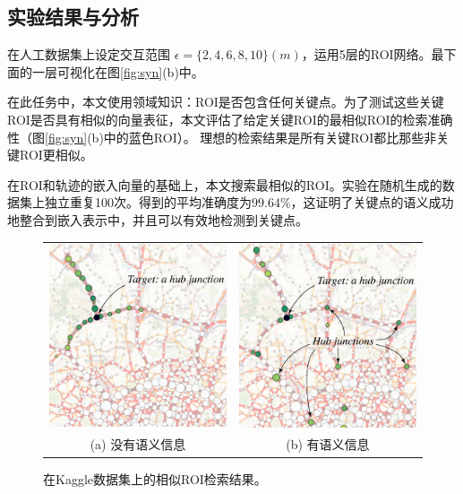 \subsection{实验结果与分析}
在人工数据集上设定交互范围 $\epsilon = \{2,4,6,8,10\}(m)$，运用5层的ROI网络。最下面的一层可视化在图\ref{fig:syn}(b)中。


在此任务中，本文使用领域知识：ROI是否包含任何关键点。为了测试这些关键ROI是否具有相似的向量表征，本文评估了给定关键ROI的最相似ROI的检索准确性（图\ref{fig:syn}(b)中的蓝色ROI）。 理想的检索结果是所有关键ROI都比那些非关键ROI更相似。

在ROI和轨迹的嵌入向量的基础上，本文搜索最相似的ROI。实验在随机生成的数据集上独立重复100次。得到的平均准确度为$\boldsymbol{99.64\%}$，这证明了关键点的语义成功地整合到嵌入表示中，并且可以有效地检测到关键点。



\tabcolsep=2pt
\begin{figure}[!t]
\centering
\begin{tabular}{cc}
\includegraphics[width=65mm]{pics/SP3.pdf}&
\includegraphics[width=65mm]{pics/SP4.pdf}\\
(a) 没有语义信息 & (b) 有语义信息
\end{tabular}
\caption{在Kaggle数据集上的相似ROI检索结果。}
\label{fig:regionSim}
\end{figure}


